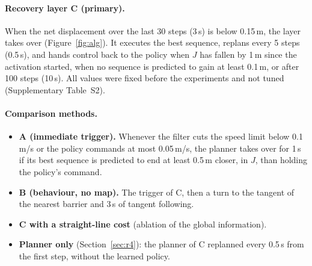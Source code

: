 \documentclass[11pt]{article}
\theoremstyle{definition}
\theoremstyle{remark}
\begin{document}
\paragraph{Recovery layer C (primary).} When the net displacement over the last 30 steps (3\,s) is below 0.15\,m, the layer takes over (Figure~\ref{fig:alg}). It executes the best sequence, replans every 5 steps (0.5\,s), and hands control back to the policy when $J$ has fallen by 1\,m since the activation started, when no sequence is predicted to gain at least 0.1\,m, or after 100 steps (10\,s). All values were fixed before the experiments and not tuned (Supplementary Table~S2).

\paragraph{Comparison methods.}
\begin{itemize}
  \item \textbf{A (immediate trigger).} Whenever the filter cuts the speed limit below 0.1\,m/s or the policy commands at most 0.05\,m/s, the planner takes over for 1\,s if its best sequence is predicted to end at least 0.5\,m closer, in $J$, than holding the policy's command.
  \item \textbf{B (behaviour, no map).} The trigger of C, then a turn to the tangent of the nearest barrier and 3\,s of tangent following.
  \item \textbf{C with a straight-line cost} (ablation of the global information).
  \item \textbf{Planner only} (Section~\ref{sec:r4}): the planner of C replanned every 0.5\,s from the first step, without the learned policy.
\end{itemize}
\end{document}
